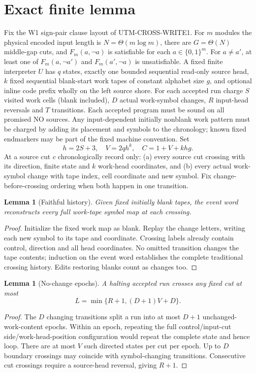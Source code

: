 \documentclass[11pt]{article}
\newtheorem{lemma}[theorem]{Lemma}
\begin{document}
\section{Exact finite lemma}
Fix the W1 sign-pair clause layout of UTM-CROSS-WRITE1. For $m$ modules the physical encoded input length is $N=\Theta(m\log m)$, there are $G=\Theta(N)$ middle-gap cuts, and $F_m(a,\neg a)$ is satisfiable for each $a\in\{0,1\}^m$. For $a\neq a'$, at least one of $F_m(a,\neg a')$ and $F_m(a',\neg a)$ is unsatisfiable. A fixed finite interpreter $U$ has $q$ states, exactly one bounded sequential read-only source head, $k$ fixed sequential blank-start work tapes of constant alphabet size $g$, and optional inline code prefix wholly on the left source shore. For each accepted run charge $S$ visited work cells (blank included), $D$ actual work-symbol changes, $R$ input-head reversals and $T$ transitions. Each accepted program must be sound on all promised NO sources. Any input-dependent initially nonblank work pattern must be charged by adding its placement and symbols to the chronology; known fixed endmarkers may be part of the fixed machine convention.
Set
\[
h=2S+3,\quad V=2qh^k,\quad C=1+V+khg.
\tag{1}
\]
At a source cut $c$ chronologically record only: (a) every source cut crossing with its direction, finite state and $k$ work-head coordinates, and (b) every actual work-symbol change with tape index, cell coordinate and new symbol. Fix change-before-crossing ordering when both happen in one transition.
\begin{lemma}[Faithful history]\label{l:decode}Given fixed initially blank tapes, the event word reconstructs every full work-tape symbol map at each crossing.\end{lemma}
\begin{proof}Initialize the fixed work map as blank. Replay the change letters, writing each new symbol to its tape and coordinate. Crossing labels already contain control, direction and all head coordinates. No omitted transition changes the tape contents; induction on the event word establishes the complete traditional crossing history. Edits restoring blanks count as changes too.\end{proof}
\begin{lemma}[No-change epochs]\label{l:epoch}A halting accepted run crosses any fixed cut at most
\[
L=\min\{R+1,(D+1)V+D\}.
\tag{2}
\]
\end{lemma}
\begin{proof}The $D$ changing transitions split a run into at most $D+1$ unchanged-work-content epochs. Within an epoch, repeating the full control/input-cut side/work-head-position configuration would repeat the complete state and hence loop. There are at most $V$ such directed states per cut per epoch. Up to $D$ boundary crossings may coincide with symbol-changing transitions. Consecutive cut crossings require a source-head reversal, giving $R+1$.\end{proof}
\end{document}
